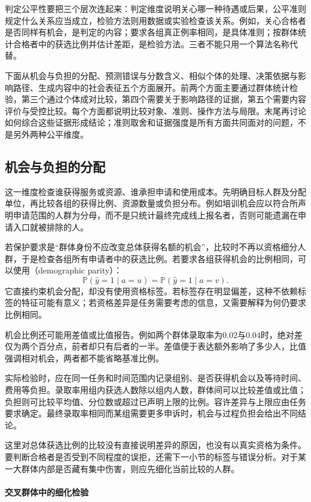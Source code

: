 判定公平性要把三个层次连起来：判定维度说明关心哪一种待遇或后果，公平准则规定什么关系应当成立，检验方法则用数据或实验检查该关系。例如，关心合格者是否同样有机会，是判定的内容；要求各组真正例率相同，是具体准则；按群体统计合格者中的获选比例并估计差距，是检验方法。三者不能只用一个算法名称代替。

下面从机会与负担的分配、预测错误与分数含义、相似个体的处理、决策依据与影响路径、生成内容中的社会表征五个方面展开。前两个方面主要通过群体统计检验，第三个通过个体成对比较，第四个需要关于影响路径的证据，第五个需要内容评价与受控比较。每个方面都说明比较对象、准则、操作方法与局限。末尾再讨论如何综合这些证据形成结论；准则取舍和证据强度是所有方面共同面对的问题，不是另外两种公平维度。

\subsection{机会与负担的分配}
\label{sec:fairness-group-comparison}

这一维度检查谁获得服务或资源、谁承担申请和使用成本。先明确目标人群及分配单位，再比较各组的获得比例、资源数量或负担分布。例如培训机会应以符合所声明申请范围的人群为分母，而不是只统计最终完成线上报名者，否则可能遗漏在申请入口就被排除的人。

若保护要求是“群体身份不应改变总体获得名额的机会”，比较时不再以资格细分人群，于是检查各组所有申请者中的获选比例。若要求各组获得机会的比例相同，可以使用（demographic parity）：
\[
 \mathbb P(\hat y=1\mid a=u)
 =\mathbb P(\hat y=1\mid a=v).
\]
它直接约束机会分配，却没有使用资格标签。若标签存在明显偏差，这种不依赖标签的特征可能有意义；若资格差异是任务需要考虑的信息，又需要解释为何仍要求比例相同。

机会比例还可能用差值或比值报告。例如两个群体录取率为$0.02$与$0.04$时，绝对差仅为两个百分点，前者却只有后者的一半。差值便于表达额外影响了多少人，比值强调相对机会，两者都不能省略基准比例。

实际检验时，应在同一任务和时间范围内记录组别、是否获得机会以及等待时间、费用等负担。录取率用组内获选人数除以组内人数，群体间可以比较差值或比值；负担则可比较平均值、分位数或超过已声明上限的比例。容许差异与上限应由任务要求确定。最终录取率相同而某组需要更多申诉时，机会与过程负担会给出不同结论。

这里对总体获选比例的比较没有直接说明差异的原因，也没有以真实资格为条件。要判断合格者是否受到不同程度的误拒，还需下一小节的标签与错误分析。对于某一大群体内部是否藏有集中伤害，则应先细化当前比较的人群。

\paragraph{交叉群体中的细化检验}

